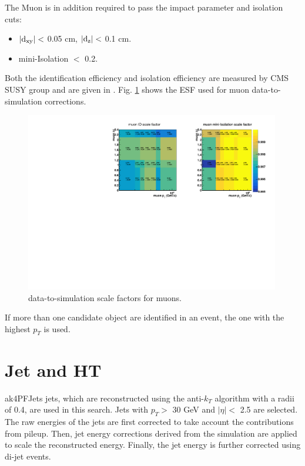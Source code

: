 \documentclass[thesis.tex]{subfiles}
\renewcommand\_{\textunderscore\allowbreak}
\begin{document}
The Muon is in addition required to pass the impact parameter and isolation cuts:
\begin{center}
\begin{itemize}
\item $\mathrm{|d_{xy}|} <$ 0.05 cm, $\mathrm{|d_{z}|} <$ 0.1 cm.
\item mini-Isolation $<$ 0.2.
\end{itemize}
\end{center}

Both the identification efficiency and isolation efficiency are measured by CMS SUSY group and are given in \cite{EGM:leptonScale}. Fig. \ref{fig:muonsf} shows the ESF used for muon data-to-simulation corrections.

\begin{figure}[hbtp]
	\centering
	\includegraphics[width=0.99\textwidth]{plot/SF_Muon.pdf}
	\caption{data-to-simulation scale factors for muons.}
	\label{fig:muonsf}
\end{figure}

If more than one candidate object are identified in an event, the one with the highest $p_{T}$ is used.

\section{Jet and HT}
\label{sec:jetID}
ak4PFJets jets, which are reconstructed using the anti-$k_T$ algorithm with a radii of 0.4, are used in this search.
Jets with $p_T >$ 30 GeV and $|\eta| <$ 2.5 are selected. 
The raw energies of the jets are first corrected to take account the contributions from pileup.
Then, jet energy corrections \cite{CMS:JES} derived from the simulation are applied to scale the reconstructed energy.
Finally, the jet energy is further corrected using di-jet events. 
\end{document}
